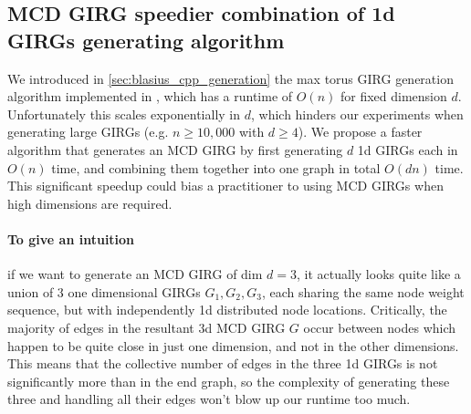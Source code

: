 







\subsection{MCD GIRG speedier combination of 1d GIRGs generating algorithm}
We introduced in \cref{sec:blasius_cpp_generation} the max torus GIRG generation algorithm implemented in \cite{blasius2022efficiently}, which has a runtime of $O(n)$ for fixed dimension $d$. Unfortunately this scales exponentially in $d$, which hinders our experiments when generating large GIRGs (e.g. $n \geq 10,000$ with $d \geq 4$).
We propose a faster algorithm that generates an MCD GIRG by first generating $d$ 1d GIRGs each in $O(n)$ time, and combining them together into one graph in total $O(dn)$ time. This significant speedup could bias a practitioner to using MCD GIRGs when high dimensions are required.

\paragraph{To give an intuition} if we want to generate an MCD GIRG of dim $d=3$, it actually looks quite like a union of $3$ one dimensional GIRGs $G_1, G_2, G_3$, each sharing the same node weight sequence, but with independently 1d distributed node locations. Critically, the majority of edges in the resultant 3d MCD GIRG $G$ occur between nodes which happen to be quite close in just one dimension, and not in the other dimensions. This means that the collective number of edges in the three 1d GIRGs is not significantly more than in the end graph, so the complexity of generating these three and handling all their edges won't blow up our runtime too much.

